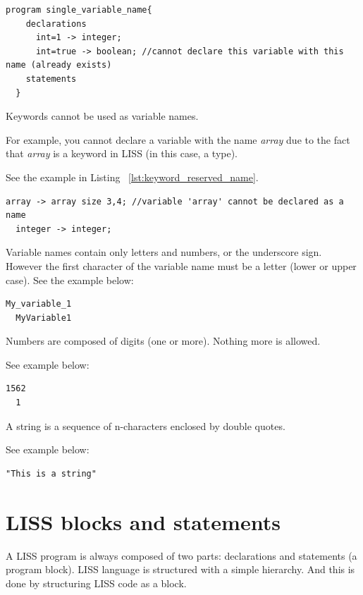 \documentclass[
  oneside,
  11pt, a4paper,
  footinclude=true,
  headinclude=true,
  cleardoublepage=empty
]{scrbook}
\begin{document}
\begin{lstlisting}[caption={Conflicts with variable names},label={lst:variable_name_single}]
  program single_variable_name{
    declarations
      int=1 -> integer;
      int=true -> boolean; //cannot declare this variable with this name (already exists)
    statements
  }
\end{lstlisting}

Keywords cannot be used as variable names.

For example, you cannot declare a variable with the name \textit{array} due to the fact that \textit{array} is a keyword in LISS (in this case, a type).

See the example in Listing ~\ref{lst:keyword_reserved_name}.
\begin{lstlisting}[caption={Conflicts with keyword names},label={lst:keyword_reserved_name}]
  array -> array size 3,4; //variable 'array' cannot be declared as a name
  integer -> integer;
\end{lstlisting}

Variable names contain only letters and numbers, or the underscore sign. However the first character of the variable name must be a letter (lower or upper case).
See the example below:

\begin{lstlisting}[caption={},label={}]
  My_variable_1
  MyVariable1
\end{lstlisting}

Numbers are composed of digits (one or more). 
Nothing more is allowed.

See example below:

\begin{lstlisting}[caption={},label={}]
  1562
  1
\end{lstlisting}

A string is a sequence of n-characters enclosed by double quotes.

See example below:

\begin{lstlisting}[caption={},label={}]
  "This is a string"
\end{lstlisting}

\section{LISS blocks and statements}

A LISS program is always composed of two parts: declarations and statements (a program block).
LISS language is structured with a simple hierarchy.
And this is done by structuring LISS code as a block.
\end{document}
